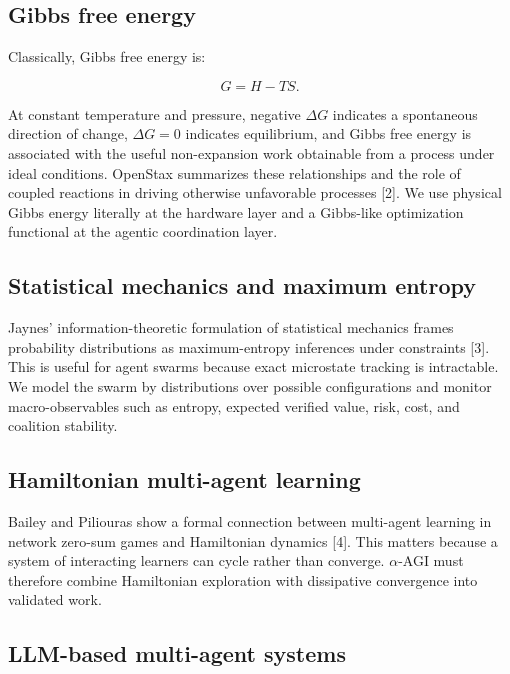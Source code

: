 \documentclass[
  11pt,
]{article}
\begin{document}
\subsection{Gibbs free energy}\label{gibbs-free-energy}

Classically, Gibbs free energy is:

\[
G=H-TS.
\]

At constant temperature and pressure, negative \(\Delta G\) indicates a
spontaneous direction of change, \(\Delta G=0\) indicates equilibrium,
and Gibbs free energy is associated with the useful non-expansion work
obtainable from a process under ideal conditions. OpenStax summarizes
these relationships and the role of coupled reactions in driving
otherwise unfavorable processes {[}2{]}. We use physical Gibbs energy
literally at the hardware layer and a Gibbs-like optimization functional
at the agentic coordination layer.

\subsection{Statistical mechanics and maximum
entropy}\label{statistical-mechanics-and-maximum-entropy}

Jaynes' information-theoretic formulation of statistical mechanics
frames probability distributions as maximum-entropy inferences under
constraints {[}3{]}. This is useful for agent swarms because exact
microstate tracking is intractable. We model the swarm by distributions
over possible configurations and monitor macro-observables such as
entropy, expected verified value, risk, cost, and coalition stability.

\subsection{Hamiltonian multi-agent
learning}\label{hamiltonian-multi-agent-learning}

Bailey and Piliouras show a formal connection between multi-agent
learning in network zero-sum games and Hamiltonian dynamics {[}4{]}.
This matters because a system of interacting learners can cycle rather
than converge. $\alpha$-AGI must therefore combine Hamiltonian exploration with
dissipative convergence into validated work.

\subsection{LLM-based multi-agent
systems}\label{llm-based-multi-agent-systems}
\end{document}
